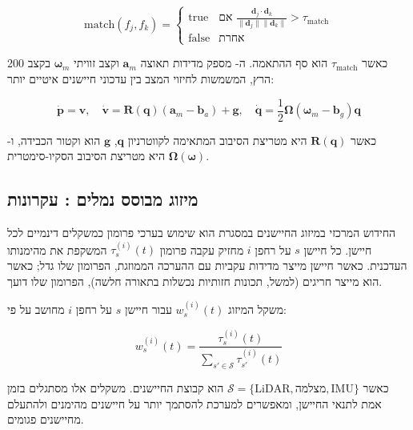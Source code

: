 \begin{equation}
\text{match}(f_{j}, f_{k}) = \begin{cases}
\text{true} & \text{אם } \frac{\mathbf{d}_{j} \cdot \mathbf{d}_{k}}{\|\mathbf{d}_{j}\|\|\mathbf{d}_{k}\|} > \tau_{\text{match}} \\
\text{false} & \text{אחרת}
\end{cases}
\label{eq:feature_match}
\end{equation}

כאשר $\tau_{\text{match}}$ הוא סף ההתאמה. ה- מספק מדידות תאוצה $\mathbf{a}_{m}$ וקצב זוויתי $\boldsymbol{\omega}_{m}$ בקצב 200 הרץ, המשמשות לחיזוי המצב בין עדכוני חיישנים איטיים יותר:

\begin{equation}
\dot{\mathbf{p}} = \mathbf{v}, \quad \dot{\mathbf{v}} = \mathbf{R}(\mathbf{q})(\mathbf{a}_{m} - \mathbf{b}_{a}) + \mathbf{g}, \quad \dot{\mathbf{q}} = \frac{1}{2} \boldsymbol{\Omega}(\boldsymbol{\omega}_{m} - \mathbf{b}_{g}) \mathbf{q}
\label{eq:imu_kinematics}
\end{equation}

כאשר $\mathbf{R}(\mathbf{q})$ היא מטריצת הסיבוב המתאימה לקווטרניון $\mathbf{q}$, $\mathbf{g}$ הוא וקטור הכבידה, ו-$\boldsymbol{\Omega}(\boldsymbol{\omega})$ היא מטריצת הסיבוב הסקיו-סימטרית.

\subsection{מיזוג מבוסס נמלים : עקרונות}
\label{sec:ant_fusion_principles}

החידוש המרכזי במיזוג החיישנים במסגרת  הוא שימוש בערכי פרומון כמשקלים דינמיים לכל חיישן. כל חיישן $s$ על רחפן $i$ מחזיק עקבה פרומון $\tau_{s}^{(i)}(t)$ המשקפת את מהימנותו העדכנית. כאשר חיישן מייצר מדידות עקביות עם ההערכה הממוזגת, הפרומון שלו גדל; כאשר הוא מייצר חריגים (למשל, תכונות חזותיות נכשלות בתאורה חלשה), הפרומון שלו דועך.

משקל המיזוג $w_{s}^{(i)}(t)$ עבור חיישן $s$ על רחפן $i$ מחושב על פי:

\begin{equation}
w_{s}^{(i)}(t) = \frac{\tau_{s}^{(i)}(t)}{\sum_{s' \in \mathcal{S}} \tau_{s'}^{(i)}(t)}
\label{eq:pheromone_weight}
\end{equation}

כאשר $\mathcal{S} = \{\text{LiDAR}, \text{מצלמה}, \text{IMU}\}$ הוא קבוצת החיישנים. משקלים אלו מסתגלים בזמן אמת לתנאי החיישן, ומאפשרים למערכת להסתמך יותר על חיישנים מהימנים ולהתעלם מחיישנים פגומים.

